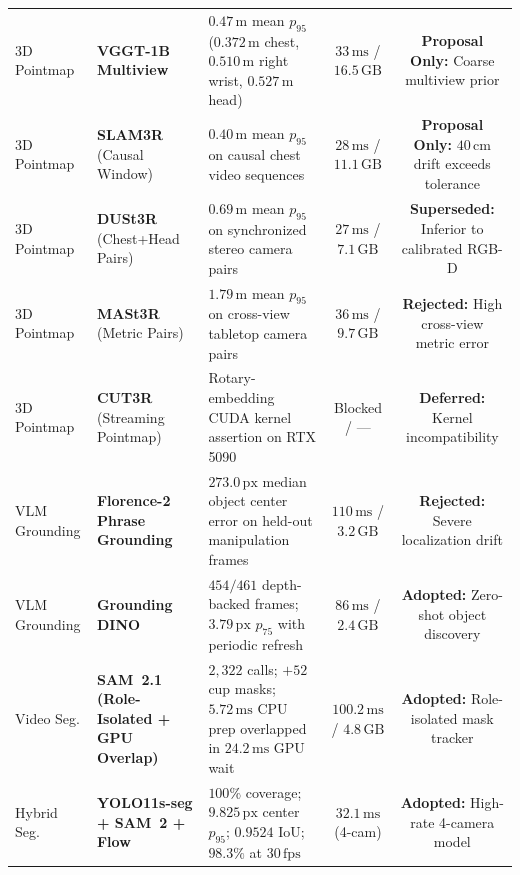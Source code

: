 \documentclass[10pt,journal]{IEEEtran}
\begin{document}
\begin{table}[t]
{\begin{tabular}{@{}llp{6.6cm}cc@{}}
        3D Pointmap & \textbf{VGGT-1B Multiview}~\cite{wang2025vggt} & $0.47\,\mathrm{m}$ mean $p_{95}$ ($0.372\,\mathrm{m}$ chest, $0.510\,\mathrm{m}$ right wrist, $0.527\,\mathrm{m}$ head) & $33\,\mathrm{ms}$ / $16.5\,\mathrm{GB}$ & \textbf{Proposal Only:} Coarse multiview prior \\
        3D Pointmap & \textbf{SLAM3R} (Causal Window)~\cite{liu2025slam3r} & $0.40\,\mathrm{m}$ mean $p_{95}$ on causal chest video sequences & $28\,\mathrm{ms}$ / $11.1\,\mathrm{GB}$ & \textbf{Proposal Only:} $40\,\mathrm{cm}$ drift exceeds tolerance \\
        3D Pointmap & \textbf{DUSt3R} (Chest+Head Pairs)~\cite{wang2024dust3r} & $0.69\,\mathrm{m}$ mean $p_{95}$ on synchronized stereo camera pairs & $27\,\mathrm{ms}$ / $7.1\,\mathrm{GB}$ & \textbf{Superseded:} Inferior to calibrated RGB-D \\
        3D Pointmap & \textbf{MASt3R} (Metric Pairs)~\cite{leroy2024mast3r} & $1.79\,\mathrm{m}$ mean $p_{95}$ on cross-view tabletop camera pairs & $36\,\mathrm{ms}$ / $9.7\,\mathrm{GB}$ & \textbf{Rejected:} High cross-view metric error \\
        3D Pointmap & \textbf{CUT3R} (Streaming Pointmap)~\cite{wang2025cut3r} & Rotary-embedding CUDA kernel assertion on RTX 5090 & Blocked / --- & \textbf{Deferred:} Kernel incompatibility \\
        VLM Grounding & \textbf{Florence-2 Phrase Grounding}~\cite{xiao2024florence2} & $273.0\,\mathrm{px}$ median object center error on held-out manipulation frames & $110\,\mathrm{ms}$ / $3.2\,\mathrm{GB}$ & \textbf{Rejected:} Severe localization drift \\
        VLM Grounding & \textbf{Grounding DINO}~\cite{liu2023grounding} & $454/461$ depth-backed frames; $3.79\,\mathrm{px}$ $p_{75}$ with periodic refresh & $86\,\mathrm{ms}$ / $2.4\,\mathrm{GB}$ & \textbf{Adopted:} Zero-shot object discovery \\
        Video Seg. & \textbf{SAM~2.1 (Role-Isolated + GPU Overlap)}~\cite{ravi2024sam2} & $2{,}322$ calls; $+52$ cup masks; $5.72\,\mathrm{ms}$ CPU prep overlapped in $24.2\,\mathrm{ms}$ GPU wait & $100.2\,\mathrm{ms}$ / $4.8\,\mathrm{GB}$ & \textbf{Adopted:} Role-isolated mask tracker \\
        Hybrid Seg. & \textbf{YOLO11s-seg + SAM~2 + Flow}~\cite{jocher2024yolo11,farneback2003two} & $100\%$ coverage; $9.825\,\mathrm{px}$ center $p_{95}$; $0.9524$ IoU; $98.3\%$ at $30\,\mathrm{fps}$ & $32.1\,\mathrm{ms}$ (4-cam) & \textbf{Adopted:} High-rate 4-camera model \\

\end{tabular}}
\end{table}
\end{document}
